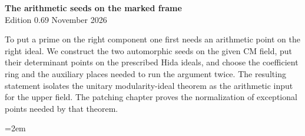 \begin{center}
{\Large\bfseries The arithmetic seeds on the marked frame}\\[4pt]
Edition 0.69  November 2026
\end{center}

To put a prime on the right component one first needs an arithmetic
point on the right ideal. We construct the two automorphic seeds on
the given CM field, put their determinant points on the prescribed
Hida ideals, and choose the coefficient ring and the auxiliary
places needed to run the argument twice. The resulting statement
isolates the unitary modularity-ideal theorem as the arithmetic
input for the upper field. The patching chapter proves the
normalization of exceptional points needed by that theorem.

\begingroup\emergencystretch=2em





\endgroup

